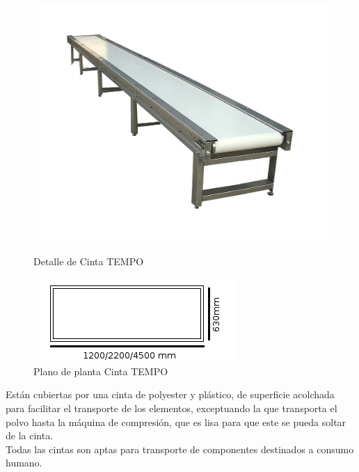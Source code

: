 	\begin{figure}[htp]
		\begin{minipage}{.48\textwidth}
			\centering
			\includegraphics[scale=0.15]{Datasheets/11Foto2.png}
			\caption{Detalle de Cinta TEMPO}
			\label{fig:testa}
		\end{minipage}
		\begin{minipage}{.48\textwidth}
			\centering
			\includegraphics[scale=1]{Datasheets/Miniaturas/cinta.png}
			\caption{Plano de planta Cinta TEMPO}
			\label{fig:testb}
		\end{minipage}
	\end{figure}
	
	

	Están cubiertas por una cinta de polyester y plástico, de superficie acolchada para facilitar el transporte de los elementos, exceptuando la que transporta el polvo hasta la máquina de compresión, que es lisa para que este se pueda soltar de la cinta. \\

	Todas las cintas son aptas para transporte de componentes destinados a consumo humano. 

